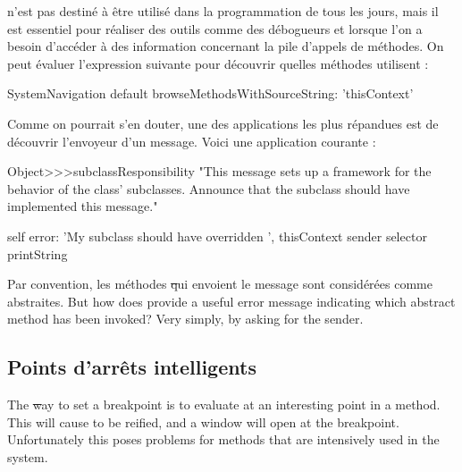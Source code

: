 \documentclass[a4paper,10pt,twoside]{book}
\begin{document}
 n'est pas destiné à être utilisé dans la programmation de tous les jours, mais il est essentiel pour réaliser des outils comme des débogueurs et lorsque l'on a besoin d'accéder à des information concernant la pile d'appels de méthodes.
On peut évaluer l'expression suivante pour découvrir quelles méthodes utilisent :

\begin{code}{}
SystemNavigation default browseMethodsWithSourceString: 'thisContext'
\end{code}

Comme on pourrait s'en douter, une des applications les plus répandues est de découvrir l'envoyeur d'un message.
Voici une application courante :
\begin{code}{}
Object>>>subclassResponsibility
	"This message sets up a framework for the behavior of the class' subclasses.
	Announce that the subclass should have implemented this message."

	self error: 'My subclass should have overridden ', thisContext sender selector printString
\end{code}

Par convention, les méthodes \st qui envoient le message  sont considérées comme abstraites. But how does  provide a useful error message indicating which abstract method has been invoked?  Very simply, by asking  for the sender.

\subsection{Points d'arrêts intelligents}

The \st way to set a breakpoint is to evaluate  at an interesting point in a method.  This will cause  to be reified, and a  window will open at the breakpoint.
Unfortunately this poses problems for methods that are intensively used in the system.
\end{document}
